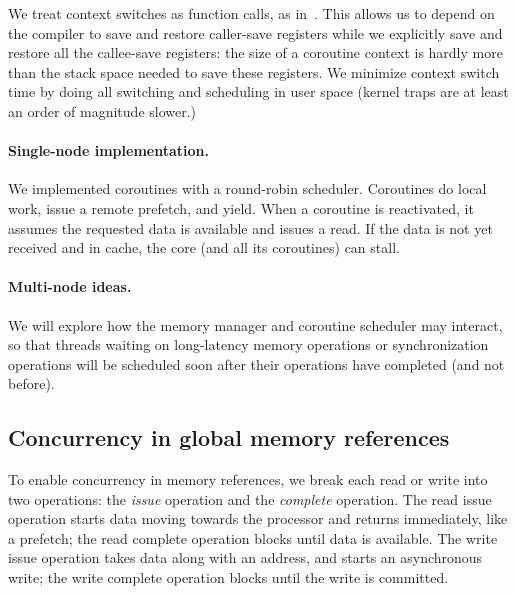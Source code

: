 \documentclass[10pt,nocopyrightspace,preprint]{sigplanconf}
\begin{document}
We treat context switches as function calls, as in~\cite{charm}. This allows us 
to depend on the compiler to save and restore caller-save registers while we explicitly save and restore all the callee-save registers:  the size of a coroutine context is hardly more than the stack space needed to save these registers.  We minimize
context switch time by doing all switching and scheduling in user space (kernel traps are at least an order of magnitude slower.)

\paragraph{Single-node implementation.}  We implemented coroutines
with a round-robin scheduler. Coroutines do local work,
issue a remote prefetch, and yield. When a
coroutine is reactivated, it assumes the requested data is available
and issues a read.  If the data is not yet received and in cache, the core
(and all its coroutines) can stall.

\paragraph{Multi-node ideas.}
We will explore how the memory manager and coroutine scheduler may
interact, so that threads waiting on long-latency memory operations or
synchronization operations will be scheduled soon after their
operations have completed (and not before).

\subsection{Concurrency in global memory references}

To enable concurrency in memory references, we break each read or
write into two operations: the {\em issue} operation and the {\em
  complete} operation. The read issue operation starts data moving
towards the processor and returns immediately, like a prefetch; the
read complete operation blocks until data is available. The write
issue operation takes data along with an address, and starts an
asynchronous write; the write complete operation blocks until the
write is committed.
\end{document}
